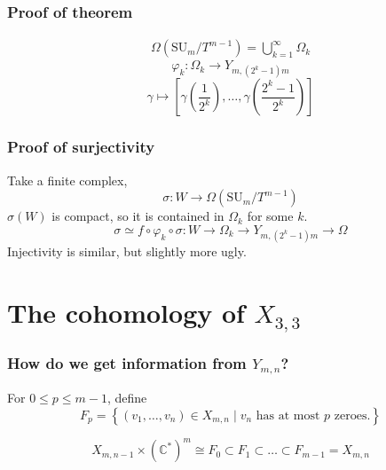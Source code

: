 \documentclass{beamer} %
\newcommand{\C}{\mathbb{C}}
\newcommand{\SUT}[1]{\SU_{#1}/T^{#1-1}}
\newcommand{\SU}{\mathrm{SU}}
\newcommand{\set}[1]{\left\{ #1 \right\}}
\newcommand{\g}{\gamma}
\begin{document}
\begin{frame}
  \frametitle{Proof of theorem}
  \begin{align*}
    \Omega(\SUT{m}) = \bigcup_{k=1}^\infty \Omega_k
  \end{align*} \pause
  \[ \varphi_k : \Omega_k \to Y_{m,(2^k-1)m} \]
  \[ \g \mapsto \left[\g\left(\frac{1}{2^k}\right),\dots,
    \g\left(\frac{2^k-1}{2^k}\right) \right] \]
\end{frame}

\begin{frame}
  \frametitle{Proof of surjectivity}
  Take a finite complex,
  \[ \sigma : W \to \Omega(\SUT{m}) \] \pause
  $\sigma(W)$ is compact, so it is contained in $\Omega_k$ for some
  $k$. \newline\pause
  \[ \sigma \simeq f \circ \varphi_k \circ \sigma : W \to \Omega_k \to
  Y_{m,(2^k-1)m} \to \Omega \] \newline\pause
  Injectivity is similar, but slightly more ugly.
\end{frame}

\section{The cohomology of $X_{3,3}$}

\begin{frame}
  \frametitle{How do we get information from $Y_{m,n}$?}
  \begin{definition}
    For $0 \leq p \leq m-1$, define
    \[ F_p = \set{(v_1,\dots,v_n) \in X_{m,n} \mid v_n \text{ has at
        most } p \text{ zeroes.} } \]
  \end{definition} \pause
  \[ X_{m,n-1}\times (\C^*)^m \cong F_0 \subset F_1 \subset \dots
  \subset F_{m-1} = X_{m,n} \]

\end{frame}

\end{document}
